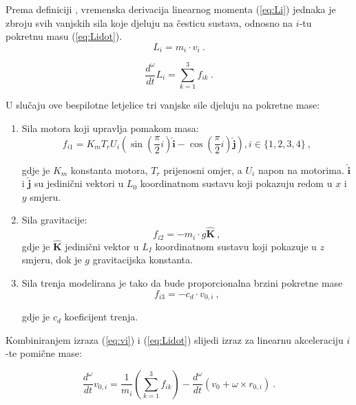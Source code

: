 \documentclass[11pt,a4paper]{article}
\begin{document}
Prema definiciji \cite{ilijic}, vremenska derivacija linearnog momenta (\ref{eq:Li}) jednaka je zbroju svih vanjskih sila koje djeluju na česticu sustava, odnosno na $i$-tu pokretnu masu (\ref{eq:Lidot}). 
\begin{equation}
 {L_{i} = m_{i} \cdot v_{i}} \ .
\label{eq:Li}
\end{equation}

\begin{equation}
 {\frac{d^{\omega}}{dt} L_{i} = \sum_{k=1}^{3}f_{ik}} \ .
\label{eq:Lidot}
\end{equation}

U slučaju ove bespilotne letjelice tri vanjske sile djeluju na pokretne mase:

\begin{enumerate}
 \item Sila motora koji upravlja pomakom masa:
\begin{equation}
f_{i1}  =K_{m}T_{r}U_{i}\left(\sin\left(\frac{\pi}{2}i\right) \bm{\hat{i}} - \cos\left( \frac{\pi}{2}i\right) \bm{\hat{j}}\right), i \in \{1,2,3,4\} \ ,
\label{eq:fi1}
\end{equation}

gdje je $K_{m}$ konstanta motora, $T_{r}$ prijenosni omjer, a $U_{i}$ napon na motorima.  $\bm{\hat{i}}$ i  $\bm{\hat{j}}$ su jedinični vektori u $L_{0}$ koordinatnom sustavu koji pokazuju redom u $x$ i $y$ smjeru.

\item Sila gravitacije:
\begin{equation}
f_{i2} = -m_{i}\cdot g \bm{\hat{K}} \ ,
\label{eq:fi2}
\end{equation}
gdje je  $\bm{\hat{K}}$ jedinični vektor u $L_{I}$ koordinatnom sustavu koji pokazuje u $z$ smjeru, dok je $g$ gravitacijska konstanta. 

\item Sila trenja modelirana je tako da bude proporcionalna brzini pokretne mase
\begin{equation}
f_{i3} = -c_{d} \cdot v_{0,i} \ ,
\label{eq:fi3}
\end{equation}

gdje je $c_{d}$ koeficijent trenja.

\end{enumerate}

Kombiniranjem izraza (\ref{eq:vi}) i (\ref{eq:Lidot}) slijedi izraz za linearnu akceleraciju $i$-te pomične mase:

\begin{equation}
\frac{d^{\omega}}{dt}v_{0,i} = \frac{1}{m_{i}}\left(\sum_{k=1}^{3}f_{ik}\right) - \frac{d^{\omega}}{dt} \left( v_{0} + \omega \times r_{0,i} \right)  \ .
\label{eq:voidot}
\end{equation}
\end{document}
